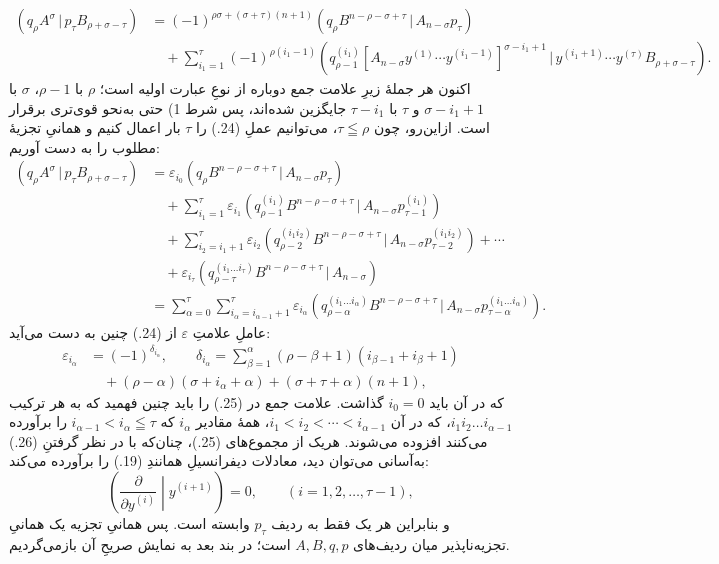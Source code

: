 \documentclass[11pt]{article}
\providecommand{\pair}[2]{(#1\,|\,#2)}
\providecommand{\eps}{\varepsilon}
\begin{document}
\begin{equation}
\begin{aligned}
\pair{q_\rho A^\sigma}{p_\tau B_{\rho+\sigma-\tau}}
&=(-1)^{\rho\sigma+(\sigma+\tau)(n+1)}
  \pair{q_\rho B^{n-\rho-\sigma+\tau}}{A_{n-\sigma}p_\tau}\\
&\quad+\sum_{i_1=1}^{\tau}(-1)^{\rho(i_1-1)}
 \pair{q_{\rho-1}^{(i_1)}[A_{n-\sigma}y^{(1)}\cdots y^{(i_1-1)}]^{\sigma-i_1+1}}
 {y^{(i_1+1)}\cdots y^{(\tau)}B_{\rho+\sigma-\tau}}.
\end{aligned}
\tag{24}
\end{equation}
اکنون هر جملهٔ زیرِ علامت جمع دوباره از نوعِ عبارت اولیه است؛ $\rho$ با $\rho-1$، $\sigma$ با $\sigma-i_1+1$ و $\tau$ با $\tau-i_1$ جایگزین شده‌اند، پس شرط 1) حتی به‌نحو قوی‌تری برقرار است. ازاین‌رو، چون $\tau\leqq\rho$، می‌توانیم عملِ (24.) را $\tau$ بار اعمال کنیم و همانیِ تجزیهٔ مطلوب را به دست آوریم:
\begin{equation}
\begin{aligned}
\pair{q_\rho A^\sigma}{p_\tau B_{\rho+\sigma-\tau}}
&=\eps_{i_0}\pair{q_\rho B^{n-\rho-\sigma+\tau}}{A_{n-\sigma}p_\tau}\\
&\quad+\sum_{i_1=1}^{\tau}\eps_{i_1}
 \pair{q_{\rho-1}^{(i_1)}B^{n-\rho-\sigma+\tau}}{A_{n-\sigma}p_{\tau-1}^{(i_1)}}\\
&\quad+\sum_{i_2=i_1+1}^{\tau}\eps_{i_2}
 \pair{q_{\rho-2}^{(i_1i_2)}B^{n-\rho-\sigma+\tau}}{A_{n-\sigma}p_{\tau-2}^{(i_1i_2)}}+\cdots\\
&\quad+\eps_{i_\tau}\pair{q_{\rho-\tau}^{(i_1\ldots i_\tau)}B^{n-\rho-\sigma+\tau}}{A_{n-\sigma}}\\
&=\sum_{\alpha=0}^{\tau}\sum_{i_\alpha=i_{\alpha-1}+1}^{\tau}\eps_{i_\alpha}
 \pair{q_{\rho-\alpha}^{(i_1\ldots i_\alpha)}B^{n-\rho-\sigma+\tau}}{A_{n-\sigma}p_{\tau-\alpha}^{(i_1\ldots i_\alpha)}}.
\end{aligned}
\tag{25}
\end{equation}
عاملِ علامتِ $\eps$ از (24.) چنین به دست می‌آید:
\begin{equation}
\begin{aligned}
\eps_{i_\alpha}&=(-1)^{\delta_{i_\alpha}},\qquad
\delta_{i_\alpha}=\sum_{\beta=1}^{\alpha}(\rho-\beta+1)(i_{\beta-1}+i_\beta+1)\\
&\quad +(\rho-\alpha)(\sigma+i_\alpha+\alpha)+(\sigma+\tau+\alpha)(n+1),
\end{aligned}
\tag{26}
\end{equation}
که در آن باید $i_0=0$ گذاشت. علامت جمع در (25.) را باید چنین فهمید که به هر ترکیب $i_1i_2\ldots i_{\alpha-1}$، که در آن $i_1<i_2<\cdots<i_{\alpha-1}$، همهٔ مقادیر $i_\alpha$ که $i_{\alpha-1}<i_\alpha\leqq\tau$ را برآورده می‌کنند افزوده می‌شوند. هریک از مجموع‌های (25.)، چنان‌که با در نظر گرفتنِ (26.) به‌آسانی می‌توان دید، معادلات دیفرانسیلِ همانندِ (19.) را برآورده می‌کند:
\begin{equation}
 \left(\frac{\partial}{\partial y^{(i)}}\middle|y^{(i+1)}\right)=0,
 \qquad (i=1,2,\ldots,\tau-1),
\tag{27}
\end{equation}
و بنابراین هر یک فقط به ردیف $p_\tau$ وابسته است. پس همانیِ تجزیه یک همانیِ تجزیه‌ناپذیر میان ردیف‌های $A,B,q,p$ است؛ در بند بعد به نمایش صریحِ آن بازمی‌گردیم.
\end{document}
